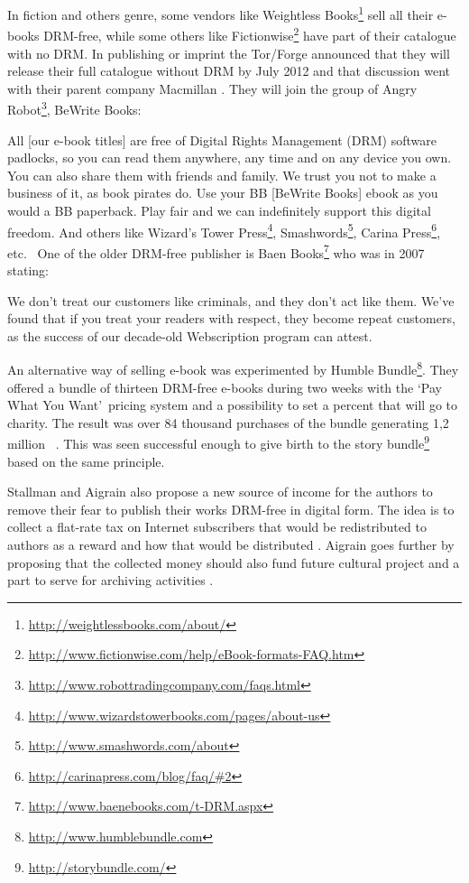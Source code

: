 \documentclass[11pt,a4paper,oneside]{memoir}
\renewenvironment{quote}
    {\list{}{\rightmargin=0pt\leftmargin=1cm\topsep=-10pt}%
    \item\relax\fontsize{10pt}{10pt}\singlespacing}
    {\endlist}
\begin{document}
In fiction and others genre,  some vendors like Weightless Books\footnote{\url{http://weightlessbooks.com/about/}} sell all their e-books DRM-free, while some others like Fictionwise\footnote{\url{http://www.fictionwise.com/help/eBook-formats-FAQ.htm}} have part of their catalogue with no DRM.
In publishing or imprint the Tor/Forge announced that they will release their full catalogue without DRM by July 2012 \cite{tor:drm-free} and that discussion went with their parent company Macmillan \cite{antipope:more_drm}.
They will join the group of Angry Robot\footnote{\url{http://www.robottradingcompany.com/faqs.html}}, BeWrite Books:
\begin{quote}
All [our e-book titles] are free of Digital Rights Management (DRM) software padlocks, so you can read them anywhere, any time and on any device you own. You can also share them with friends and family. We trust you not to make a business of it, as book pirates do. Use your BB [BeWrite Books] ebook as you would a BB paperback. Play fair and we can indefinitely support this digital freedom. \cite{bewrite:about}
\end{quote}
And others like Wizard's Tower Press\footnote{\url{http://www.wizardstowerbooks.com/pages/about-us}}, Smashwords\footnote{\url{http://www.smashwords.com/about}}, Carina Press\footnote{\url{http://carinapress.com/blog/faq/#2}}, etc. ~One of the older DRM-free publisher is Baen Books\footnote{\url{http://www.baenebooks.com/t-DRM.aspx}} who was in 2007 stating:
\begin{quote}
We don't treat our customers like criminals, and they don't act like them. We've found that if you treat your readers with respect, they become repeat customers, as the success of our decade-old Webscription program can attest. \cite{baen:subterranean}
\end{quote}

An alternative way of selling e-book was experimented by Humble Bundle\footnote{\url{http://www.humblebundle.com}}. They offered a bundle of thirteen DRM-free e-books during two weeks with the \textquoteleft Pay What You Want\textquoteright ~pricing system and a possibility to set a percent that will go to charity. The result was over 84 thousand purchases of the bundle generating 1,2 million \textdollar ~\cite[Humble eBook Bundle]{humble:eBook}. This was seen successful enough to give birth to the story bundle\footnote{\url{http://storybundle.com/}} based on the same principle. 

Stallman and Aigrain also propose a new source of income for the authors to remove their fear to publish their works DRM-free in digital form. The idea is to collect a flat-rate tax on Internet subscribers that would be redistributed to authors as a reward \cite{gnu:freedom_or_copyright}\cite[section 5.2]{aigrain:sharing} and how that would be distributed \cite{gnu:freedom_or_copyright}\cite[chapter 7]{aigrain:sharing}. Aigrain goes further by proposing that the collected money should also fund future cultural project and a part to serve for archiving activities \cite[chapter 6]{aigrain:sharing}. 
\end{document}
